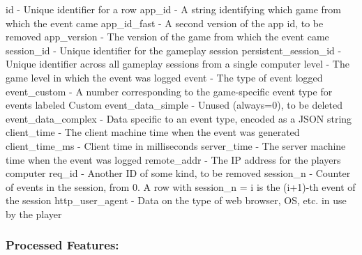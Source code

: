 id -\/ Unique identifier for a row app\+\_\+id -\/ A string identifying which game from which the event came app\+\_\+id\+\_\+fast -\/ A second version of the app id, to be removed app\+\_\+version -\/ The version of the game from which the event came session\+\_\+id -\/ Unique identifier for the gameplay session persistent\+\_\+session\+\_\+id -\/ Unique identifier across all gameplay sessions from a single computer level -\/ The game level in which the event was logged event -\/ The type of event logged event\+\_\+custom -\/ A number corresponding to the game-\/specific event type for events labeled \textquotesingle{}Custom\textquotesingle{} event\+\_\+data\+\_\+simple -\/ Unused (always=0), to be deleted event\+\_\+data\+\_\+complex -\/ Data specific to an event type, encoded as a J\+S\+ON string client\+\_\+time -\/ The client machine time when the event was generated client\+\_\+time\+\_\+ms -\/ Client time in milliseconds server\+\_\+time -\/ The server machine time when the event was logged remote\+\_\+addr -\/ The IP address for the player\textquotesingle{}s computer req\+\_\+id -\/ Another ID of some kind, to be removed session\+\_\+n -\/ Counter of events in the session, from 0. A row with session\+\_\+n = i is the (i+1)-\/th event of the session http\+\_\+user\+\_\+agent -\/ Data on the type of web browser, OS, etc. in use by the player

\subsubsection*{Processed Features\+:}

